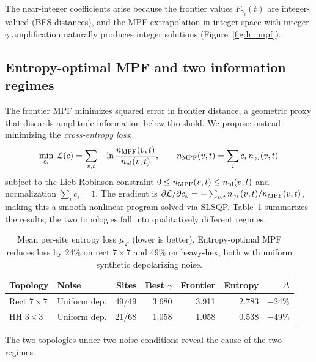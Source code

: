 \documentclass[12pt]{article}
\begin{document}
The near-integer coefficients arise because the frontier values $F_{\gamma_i}(t)$
are integer-valued (BFS distances), and the MPF extrapolation in integer space
with integer $\gamma$ amplification naturally produces integer solutions
(Figure~\ref{fig:lr_mpf}).

\subsection{Entropy-optimal MPF and two information regimes}
\label{sec:entropy_mpf}

The frontier MPF minimizes squared error in frontier distance, a geometric
proxy that discards amplitude information below threshold.
We propose instead minimizing the \emph{cross-entropy loss}:
\begin{equation}
    \min_{c_i}\; \mathcal{L}(c) = \sum_{v,t} -\ln\frac{n_{\rm MPF}(v,t)}{n_{\rm nl}(v,t)},
    \qquad n_{\rm MPF}(v,t) = \sum_i c_i\, n_{\gamma_i}(v,t)
    \label{eq:entropy_mpf}
\end{equation}
subject to the Lieb-Robinson constraint $0 \leq n_{\rm MPF}(v,t) \leq
n_{\rm nl}(v,t)$ and normalization $\sum_i c_i = 1$.
The gradient is $\partial\mathcal{L}/\partial c_k = -\sum_{v,t}
n_{\gamma_k}(v,t)/n_{\rm MPF}(v,t)$, making this a smooth nonlinear
program solved via SLSQP.
Table~\ref{tab:entropy_mpf} summarizes the results; the two topologies
fall into qualitatively different regimes.

\begin{table}[h]
\centering
\scriptsize
\setlength{\tabcolsep}{4pt}
\begin{tabular}{llrrrrr}
\toprule
Topology & Noise & Sites & Best $\gamma$ & Frontier & Entropy & $\Delta$ \\
\midrule
Rect $7\times7$  & Uniform dep.  & 49/49 & 3.680 & 3.911 & 2.783 & $-24\%$ \\
HH $3\times3$    & Uniform dep.  & 21/68 & 1.058 & 1.058 & 0.538 & $-49\%$ \\
\bottomrule
\end{tabular}
\caption{Mean per-site entropy loss $\mu_\mathcal{L}$ (lower is better).
Entropy-optimal MPF reduces loss by 24\% on rect $7\times7$ and 49\% on
heavy-hex, both with uniform synthetic depolarizing noise.}
\label{tab:entropy_mpf}
\end{table}

The two topologies under two noise conditions reveal the cause of the two regimes.
\end{document}
